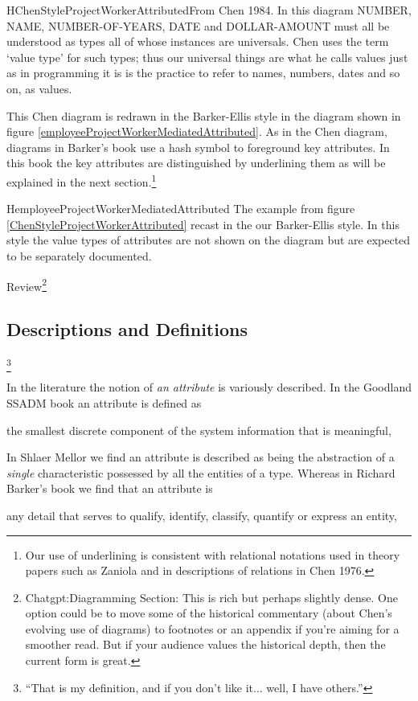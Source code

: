 \begin{erboxedFigure} {H}{ChenStyleProjectWorkerAttributed}{From Chen 1984. In this diagram NUMBER, NAME, NUMBER-OF-YEARS, DATE and DOLLAR-AMOUNT must all be understood as types all of whose instances are universals. Chen uses the term `value type' for such types;
thus our universal things are what he calls values just as in programming it is is the practice 
to refer to names, numbers, dates and so on, as values. }

\end{erboxedFigure}

This Chen diagram is redrawn in the Barker-Ellis style
 in the diagram shown in figure \ref{employeeProjectWorkerMediatedAttributed}.
As in the Chen diagram, diagrams in Barker's book use a hash symbol to foreground key attributes. In this book the key attributes are distinguished by underlining them as will be explained in the next section.\footnote{Our use of underlining is consistent with relational notations used in theory papers such as Zaniola and in descriptions of relations in Chen 1976.}
\begin{erboxedFigure} {H}{employeeProjectWorkerMediatedAttributed}
{The example from figure \ref{ChenStyleProjectWorkerAttributed} recast in the our Barker-Ellis style. 
In this style the value types of attributes are not shown on the diagram but are expected to be 
separately documented. }

\end{erboxedFigure}

Review\footnote{Chatgpt:Diagramming Section:
This is rich but perhaps slightly dense. One option could be to move some of the historical commentary (about Chen’s evolving use of diagrams) to footnotes or an appendix if you’re aiming for a smoother read. But if your audience values the historical depth, then the current form is great.}


\subsection{Descriptions and Definitions}\footnote{“That is my definition, and if you don’t like it... well, I have others.”}

\mynote
In the literature the notion of \textit{an attribute} is variously described.
In the Goodland SSADM book an attribute is defined as
\begin{erquote}
  the smallest discrete component of the system information that is meaningful,
\end{erquote}
In  Shlaer Mellor we find an attribute is described as being
the abstraction of a \textit{single} characteristic possessed by all the entities
of a type. Whereas in Richard Barker's book we find that an attribute is 
\begin{erquote}
any detail that serves to qualify, identify, classify, quantify or express an  entity,
\end{erquote}

